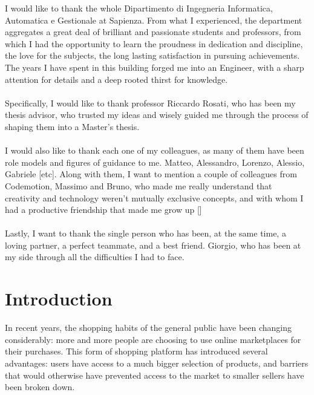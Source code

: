 \documentclass[LaM,binding=0.6cm]{sapthesis}
\begin{document}
\begin{acknowledgments}
I would like to thank the whole Dipartimento di Ingegneria Informatica, Automatica e Gestionale at Sapienza. 
From what I experienced, the department aggregates a great deal of brilliant and passionate students and professors, from which I had the opportunity to learn the proudness in dedication and discipline, the love for the subjects, the long lasting satisfaction in pursuing achievements.
The years I have spent in this building forged me into an Engineer, with a sharp attention for details and a deep rooted thirst for knowledge.
\\
\\
Specifically, I would like to thank professor Riccardo Rosati, who has been my thesis advisor, who trusted my ideas and wisely guided me through the process of shaping them into a Master's thesis.
\\
\\
I would also like to thank each one of my colleagues, as many of them have been role models and figures of guidance to me. Matteo, Alessandro, Lorenzo, Alessio, Gabriele [etc]. Along with them, I want to mention a couple of colleagues from Codemotion, Massimo and Bruno, who made me really understand that creativity and technology weren't mutually exclusive concepts, and with whom I had a productive friendship that made me grow up []
\\ 
\\
Lastly, I want to thank the single person who has been, at the same time, a loving partner, a perfect teammate, and a best friend. 
Giorgio, who has been at my side through all the difficulties I had to face. 
\\

\end{acknowledgments}

\tableofcontents

\mainmatter

\chapter{Introduction}
 In recent years, the shopping habits of the general public have been changing considerably: more and more people are choosing to use online marketplaces for their purchases. This form of shopping platform has introduced several advantages: users have access to a much bigger selection of products, and barriers that would otherwise have prevented access to the market to smaller sellers have been broken down. \\
\end{document}
